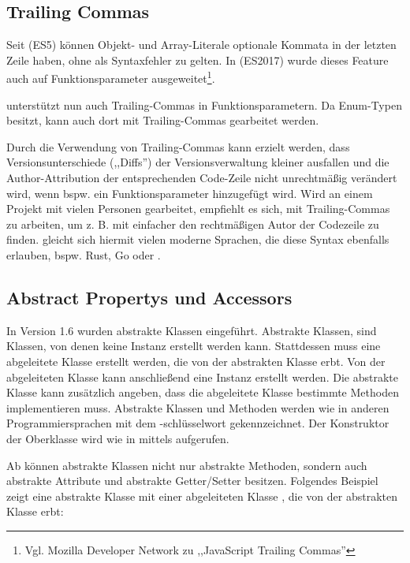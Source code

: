 \subsection{Trailing Commas}
Seit  (ES5) können Objekt- und Array-Literale optionale Kommata in der letzten Zeile haben, ohne als Syntaxfehler zu gelten. In  (ES2017) wurde dieses Feature auch auf Funktionsparameter ausgeweitet\footnote{Vgl. Mozilla Developer Network zu ,,JavaScript Trailing Commas''}.


 unterstützt nun auch Trailing-Commas in Funktionsparametern. Da \ts Enum-Typen besitzt, kann auch dort mit Trailing-Commas gearbeitet werden.

Durch die Verwendung von Trailing-Commas kann erzielt werden, dass Versionsunterschiede (,,Diffs'') der Versionsverwaltung kleiner ausfallen und die Author-Attribution der entsprechenden Code-Zeile nicht unrechtmäßig verändert wird, wenn bspw. ein Funktionsparameter hinzugefügt wird. Wird an einem Projekt mit vielen Personen gearbeitet, empfiehlt es sich, mit Trailing-Commas zu arbeiten, um z. B. mit  einfacher den rechtmäßigen Autor der Codezeile zu finden. \js gleicht sich hiermit vielen moderne Sprachen, die diese Syntax ebenfalls erlauben, bspw. Rust, Go oder \cs.

\subsection{Abstract Propertys und Accessors}
In Version 1.6 wurden abstrakte Klassen eingeführt. Abstrakte Klassen, sind Klassen, von denen keine Instanz erstellt werden kann. Stattdessen muss eine abgeleitete Klasse erstellt werden, die von der abstrakten Klasse erbt. Von der abgeleiteten Klasse kann anschließend eine Instanz erstellt werden. Die abstrakte Klasse kann zusätzlich angeben, dass die abgeleitete Klasse bestimmte Methoden implementieren muss. Abstrakte Klassen und Methoden werden wie in anderen Programmiersprachen mit dem \tsabstract-schlüsselwort gekennzeichnet. Der Konstruktor der Oberklasse wird wie in \js mittels  aufgerufen.

Ab  können abstrakte Klassen nicht nur abstrakte Methoden, sondern auch abstrakte Attribute und abstrakte Getter/Setter besitzen. Folgendes Beispiel zeigt eine abstrakte Klasse  mit einer abgeleiteten Klasse , die von der abstrakten Klasse erbt:

